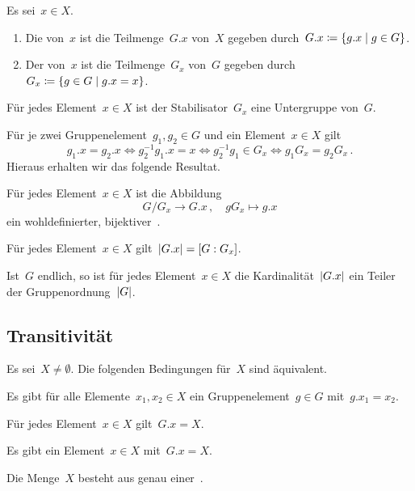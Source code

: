 \begin{definition}
  Es sei~$x \in X$.
  \begin{enumerate}
    \item
      Die  von~$x$ ist die Teilmenge~$G.x$ von~$X$ gegeben durch~$G.x \defined \{ g.x \suchthat g \in G \}$.
    \item
      Der  von~$x$ ist die Teilmenge~$G_x$ von~$G$ gegeben durch~$G_x \defined \{ g \in G \suchthat g.x = x \}$.
  \end{enumerate}
\end{definition}

\begin{proposition}
  Für jedes Element~$x \in X$ ist der Stabilisator~$G_x$ eine Untergruppe von~$G$.
\end{proposition}


Für je zwei Gruppenelement~$g_1, g_2 \in G$ und ein Element~$x \in X$ gilt
\[
  g_1.x = g_2.x
  \iff
  g_2^{-1} g_1.x = x
  \iff
  g_2^{-1} g_1 \in G_x
  \iff
  g_1 G_x = g_2 G_x \,.
\]
Hieraus erhalten wir das folgende Resultat.

\begin{corollary}
  \label{isomorphism theorem for G-sets}
  Für jedes Element~$x \in X$ ist die Abbildung
  \[
    G/G_x \to G.x \,,
    \quad
    g G_x \mapsto g.x
  \]
  ein wohldefinierter, bijektiver~.
\end{corollary}

\begin{corollary}
  Für jedes Element~$x \in X$ gilt~$\lvert G.x\rvert = [G : G_x]$.
\end{corollary}

\begin{corollary}
  Ist~$G$ endlich, so ist für jedes Element~$x \in X$ die Kardinalität~$\lvert G.x\rvert$ ein Teiler der Gruppenordnung~$\lvert G\rvert$.
\end{corollary}




\subsection{Transitivität}

\begin{proposition}
  \label{characterizations of transitive actions}
  Es sei~$X \neq \emptyset$.
  Die folgenden Bedingungen für~$X$ sind äquivalent.
  \begin{equivlist}
    \item
      Es gibt für alle Elemente~$x_1, x_2 \in X$ ein Gruppenelement~$g \in G$ mit~$g.x_1 = x_2$.
    \item
      Für jedes Element~$x \in X$ gilt~$G.x = X$.
    \item
      Es gibt ein Element~$x \in X$ mit~$G.x = X$.
    \item
      Die Menge~$X$ besteht aus genau einer~.
  \end{equivlist}
\end{proposition}

